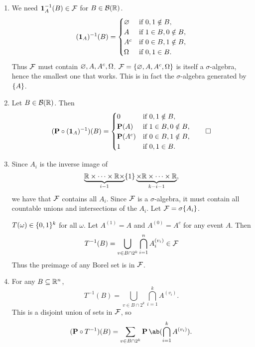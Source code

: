 \documentclass[12pt]{article}
\begin{document}
\begin{solution} \leavevmode
    \begin{enumerate}
        \item We need $\bm{1}_{A}^{-1}(B) \in \mathcal F$ for $B \in \mathcal{B}(\mathbb{R})$. \[
                (\bm{1}_{A})^{-1}(B) = \begin{cases}
                    \varnothing & \text{if } 0, 1 \notin B, \\
                    A & \text{if } 1 \in B, 0 \notin B, \\
                    A^c & \text{if } 0 \in B, 1 \notin B, \\
                    \Omega & \text{if } 0, 1 \in B.
                \end{cases}
            \]
            Thus $\mathcal F$ must contain $\varnothing, A, A^c, \Omega$.
            $\mathcal F = \{\varnothing, A, A^c, \Omega\}$ is itself a $\sigma$-algebra,
            hence the smallest one that works.
            This is in fact the $\sigma$-algebra generated by $\{A\}$.
        \item Let $B \in \mathcal{B}(\mathbb{R})$. Then \[
            ({\operatorname{\mathbf P}} \circ (\bm{1}_{A})^{-1})(B) = \begin{cases}
                    0 & \text{if } 0, 1 \notin B, \\
                    \operatorname{\mathbf P}(A) & \text{if } 1 \in B, 0 \notin B, \\
                    \operatorname{\mathbf P}(A^c) & \text{if } 0 \in B, 1 \notin B, \\
                    1 & \text{if } 0, 1 \in B.
                \end{cases} \qedhere
        \]
        \item Since $A_i$ is the inverse image of \[
            \underbrace{\mathbb{R} \times \dots \times \mathbb{R} \times}_{i-1}
                \{1\}
            \underbrace{\times \mathbb{R} \times \dots \times \mathbb{R}}_{k-i-1},
        \] we have that $\mathcal F$ contains all $A_i$.
        Since $\mathcal F$ is a $\sigma$-algebra, it must contain all countable
        unions and intersections of the $A_i$.
        Let $\mathcal F = \sigma\{A_i\}$.

        $T(\omega) \in \{0, 1\}^k$ for all $\omega$.
        Let $A^{(1)} = A$ and $A^{(0)} = A^c$ for any event $A$.
        Then \[
            T^{-1}(B) = \bigcup_{v \in B \cap 2^k}
                \bigcap_{i=1}^n A_i^{(v_i)} \in \mathcal F
        \] Thus the preimage of any Borel set is in $\mathcal F$.
        \item For any $B \subseteq \mathbb{R}^n$, \[
            T^{-1}(B) = \bigcup_{v \in B \cap 2^k}
                \bigcap_{i=1}^k A^{(v_i)}.
        \] This is a disjoint union of sets in $\mathcal F$, so \[
            ({\P} \circ T^{-1})(B) = \sum_{v \in B \cap 2^k}
                \P\ab(\bigcap_{i=1}^k A^{(v_i)}).
        \]
    \end{enumerate}
\end{solution}
\end{document}
